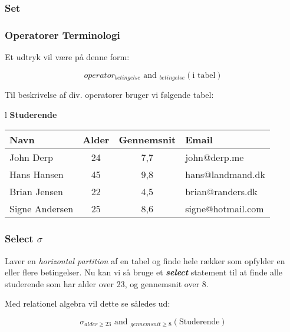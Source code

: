 \subsubsection{Set}

\subsubsection{Operatorer Terminologi}

Et udtryk vil være på denne form:

\begin{equation*}
operator_{betingelse} \text{ and } _{betingelse} (\text{i tabel})
\end{equation*}

Til beskrivelse af div. operatorer bruger vi følgende tabel:

\setlength{\tabcolsep}{10pt}
\renewcommand{\arraystretch}{1.2}
\begin{center}
	\begin{tabular}{l}\label{tab:stud}
		\textbf{\large Studerende}	\\
		\begin{tabular}{|l|c|c|l|}		
			\hline
			\textbf{Navn}&\textbf{Alder}&\textbf{Gennemsnit}&\textbf{Email}\\
			\hline
			John Derp	& 24 & 7,7	& john@derp.me		\\
			\hline
			Hans Hansen	& 45 & 9,8	& hans@landmand.dk		\\
			\hline
			Brian Jensen& 22 & 4,5	& brian@randers.dk		\\
			\hline
			Signe Andersen	& 25 & 8,6	& signe@hotmail.com		\\
			\hline
		\end{tabular}
	\end{tabular}
\end{center}

\subsubsection{Select $\sigma$}
Laver en \textit{horizontal partition} af en tabel og finde hele rækker som opfylder en eller flere betingelser.
Nu kan vi så bruge et \textbf{\textit{select}} statement til at finde alle studerende som har alder over 23, og gennemsnit over 8.

Med relationel algebra vil dette se således ud:

\begin{equation*}
\sigma_{alder \geq 23}\text{ and } _{gennemsnit \geq 8} (\text{Studerende})
\end{equation*}

